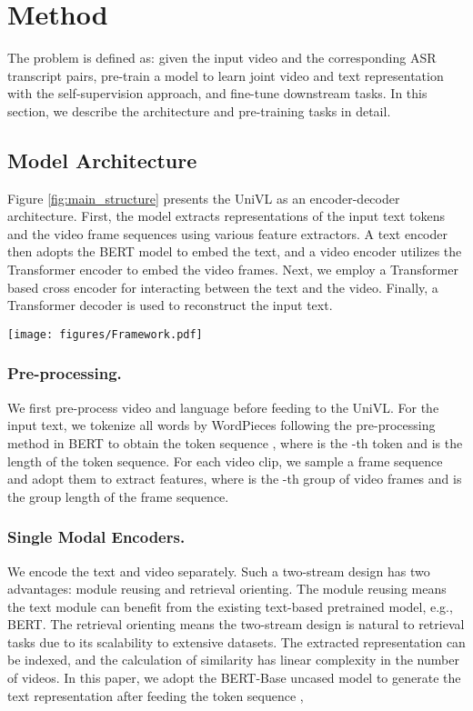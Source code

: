 \documentclass[11pt,a4paper]{article}
\begin{document}
	\section{Method}
	The problem is defined as: given the input video and the corresponding ASR transcript pairs, pre-train a model to learn joint video and text representation with the self-supervision approach, and fine-tune downstream tasks. In this section, we describe the architecture and pre-training tasks in detail.
	
	\subsection{Model Architecture}
	Figure \ref{fig:main_structure} presents the UniVL as an encoder-decoder architecture. First, the model extracts representations of the input text tokens and the video frame sequences using various feature extractors. A text encoder then adopts the BERT model to embed the text, and a video encoder utilizes the Transformer encoder to embed the video frames. Next, we employ a Transformer based cross encoder for interacting between the text and the video. Finally, a Transformer decoder is used to reconstruct the input text.
	\begin{figure*}[tp]
		\centering
		\texttt{[image: figures/Framework.pdf]} 
		\caption{The main structure of our UniVL, which comprises four components, including two single-modal encoders, a cross encoder, and a decoder. The model is flexible for many text and video downstream tasks. Four possible tasks are listed.}
		\label{fig:main_structure}
	\end{figure*} 
	
	\subsubsection{Pre-processing.} We first pre-process video and language before feeding to the UniVL. For the input text, we tokenize all words by WordPieces \cite{wu2016google} following the pre-processing method in BERT to obtain the token sequence , where  is the -th token and  is the length of the token sequence. For each video clip, we sample a frame sequence  and adopt them to extract features, where  is the -th group of video frames and  is the group length of the frame sequence.
	
	\subsubsection{Single Modal Encoders.} We encode the text and video separately. Such a two-stream design has two advantages: module reusing and retrieval orienting. The module reusing means the text module can benefit from the existing text-based pretrained model, e.g., BERT. The retrieval orienting means the two-stream design is natural to retrieval tasks due to its scalability to extensive datasets. The extracted representation can be indexed, and the calculation of similarity has linear complexity in the number of videos. In this paper, we adopt the BERT-Base uncased model to generate the  text representation  after feeding the token sequence ,
	
\end{document}
